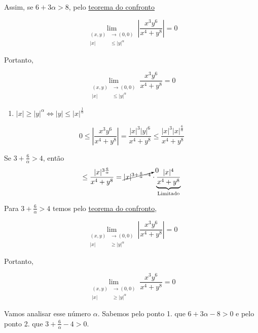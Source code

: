 \documentclass[
  letterpaper,
  DIV=11,
  numbers=noendperiod]{scrreprt}
\providecommand{\tightlist}{%
  \setlength{\itemsep}{0pt}\setlength{\parskip}{0pt}}\usepackage{longtable,booktabs,array}
\begin{document}
Assim, se \(6+3\alpha > 8\), pelo \hyperref[sec-confronto]{teorema do
confronto}

\[
\lim_{\begin{aligned}(x,y)&\rightarrow (0,0) 
\\ \lvert x \rvert &\leq \lvert y \rvert^{\alpha} \end{aligned}} 
\left\lvert \frac{x^3 y^6}{x^4+y^8} \right\rvert = 0 
\]

Portanto,

\[
\lim_{\begin{aligned}(x,y)&\rightarrow (0,0) 
\\ \lvert x \rvert &\leq \lvert y \rvert^{\alpha} \end{aligned}} 
\frac{x^3 y^6}{x^4+y^8} = 0
\]

\begin{enumerate}
\def\labelenumi{\arabic{enumi}.}
\setcounter{enumi}{1}
\tightlist
\item
  \(\lvert x \rvert \geq \lvert y \rvert^{\alpha} \Leftrightarrow \lvert y \rvert \leq \lvert x \rvert^{\frac{1}{\alpha}}\)
\end{enumerate}

\[
0 \leq \left\lvert \frac{x^3y^6}{x^4+y^8} \right\rvert = 
\frac{\lvert x \rvert^3 \lvert y \rvert^6}{x^4+y^8} \leq
\frac{\lvert x \rvert^3 \lvert x \rvert^{\frac{6}{\alpha}}}{x^4+y^8}
\]

Se \(3 + \frac{6}{\alpha} > 4\), então \[
\leq \frac{\lvert x \rvert^{3 \frac{6}{\alpha}}}{x^4+y^8} =
\cancelto{0}{\lvert x \rvert^{3 + \frac{6}{\alpha} - 4}} \cdot
\underbrace{\frac{\lvert x \rvert^4}{x^4+y^8}}_{\text{Limitado}}
\]

Para \(3 + \frac{6}{\alpha} > 4\) temos pelo
\href{limites.qmd$sec-confronto}{teorema do confronto},

\[
\lim_{\begin{aligned}(x,y)&\rightarrow (0,0) \\ 
\lvert x \rvert & \geq \lvert y \rvert^{\alpha} \end{aligned}}
\left\lvert \frac{x^3y^6}{x^4+y^8} \right\rvert = 0
\]

Portanto,

\[
\lim_{\begin{aligned}(x,y)&\rightarrow (0,0) \\ 
\lvert x \rvert & \geq \lvert y \rvert^{\alpha} \end{aligned}}
\frac{x^3y^6}{x^4+y^8}  = 0
\]

Vamos analisar esse número \(\alpha\). Sabemos pelo ponto 1. que
\(6 + 3\alpha - 8 >0\) e pelo ponto 2. que
\(3 + \frac{6}{\alpha} - 4 >0\).
\end{document}
